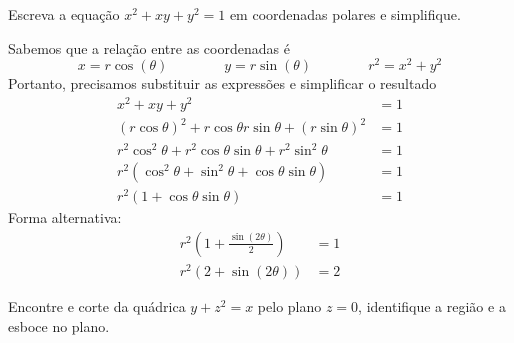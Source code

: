 \documentclass[a4paper,12pt,fleqn]{article}
\begin{document}

Escreva a equação \(x^2 + xy + y^2 = 1\) em coordenadas polares e simplifique.

\begin{answer}
  Sabemos que a relação entre as coordenadas é
  \[
    x = r\cos(\theta)
    \qquad\qquad
    y = r\sin(\theta)
    \qquad\qquad
    r^2 = x^2 + y^2
  \]
  Portanto, precisamos substituir as expressões e simplificar o resultado
  \begin{align*}
    x^2 + xy + y^2 & = 1 \\
    \left(r\cos\theta\right)^2 + r\cos\theta r\sin\theta +
    \left(r\sin\theta\right)^2 & = 1 \\
    r^2\cos^2\theta + r^2\cos\theta \sin\theta + r^2\sin^2\theta & = 1 \\
    r^2\left(\cos^2\theta + \sin^2\theta
    + \cos\theta \sin\theta \right) & = 1 \\
    r^2\left(1 + \cos\theta \sin\theta \right) & = 1
  \end{align*}
  Forma alternativa:
  \begin{align*}
    r^2\left(1 + \frac{\sin(2\theta)}{2} \right) & = 1 \\
    r^2\left(2 + \sin(2\theta) \right) & = 2
  \end{align*}
  \clearpage
\end{answer}

%

Encontre e corte da quádrica \(y + z^2 = x\)
pelo plano \(z = 0\),
identifique a região e a esboce no plano.
\end{document}

